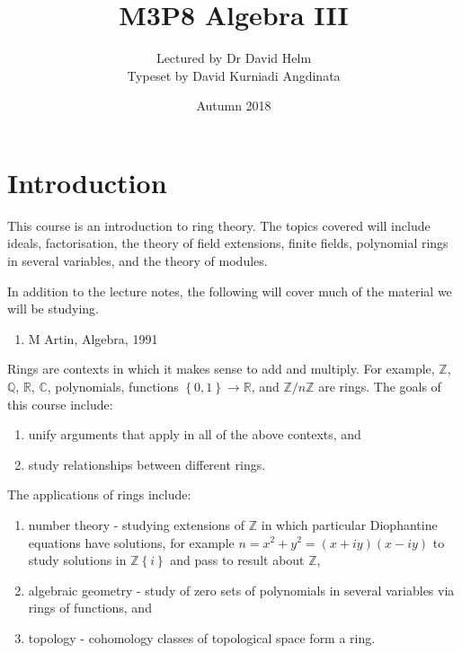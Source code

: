 \documentclass{article}
\title{M3P8 Algebra III}
\author{Lectured by Dr David Helm \\ Typeset by David Kurniadi Angdinata}
\date{Autumn 2018}
\newcommand{\Z}{\mathbb{Z}}
\newcommand{\Q}{\mathbb{Q}}
\newcommand{\R}{\mathbb{R}}
\newcommand{\C}{\mathbb{C}}
\newcommand{\rb}[1]{\left( #1 \right)}
\newcommand{\cb}[1]{\left\{ #1 \right\}}
\theoremstyle{definition}\newtheorem{definition}{Definition}[section]
\theoremstyle{definition}\newtheorem{remark}[definition]{Remark}
\theoremstyle{definition}\newtheorem*{example}{Example}
\theoremstyle{definition}\newtheorem*{note}{Note}
\begin{document}
\maketitle

\vfill

\tableofcontents

\pagebreak


\section{Introduction}

This course is an introduction to ring theory. The topics covered will include ideals, factorisation, the theory of field extensions, finite fields, polynomial rings in several variables, and the theory of modules.

In addition to the lecture notes, the following will cover much of the material we will be studying.

\begin{enumerate}
\item M Artin, Algebra, 1991
\end{enumerate}

Rings are contexts in which it makes sense to add and multiply. For example, $ \Z $, $ \Q $, $ \R $, $ \C $, polynomials, functions $ \cb{0, 1} \to \R $, and $ \Z / n\Z $ are rings. The goals of this course include:
\begin{enumerate}
\item unify arguments that apply in all of the above contexts, and
\item study relationships between different rings.
\end{enumerate}
The applications of rings include:
\begin{enumerate}
\item number theory - studying extensions of $ \Z $ in which particular Diophantine equations have solutions, for example $ n = x^2 + y^2 = \rb{x + iy}\rb{x - iy} $ to study solutions in $ \Z\cb{i} $ and pass to result about $ \Z $,
\item algebraic geometry - study of zero sets of polynomials in several variables via rings of functions, and
\item topology - cohomology classes of topological space form a ring.
\end{enumerate}
\end{document}
